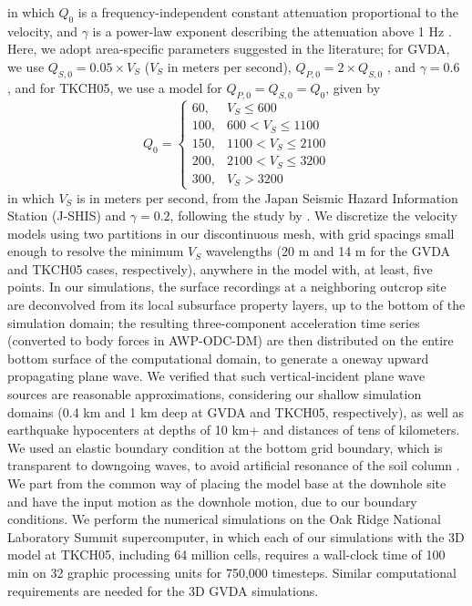 {\noindent in which $Q_0$ is a frequency-independent constant attenuation proportional to the velocity, and $\gamma$ is a power-law exponent describing the attenuation above 1 Hz \citep{withersMemoryEfficientSimulation2015}. Here, we adopt area-specific parameters suggested in the literature; for GVDA, we use $Q_{S,0}=0.05 \times V_S$ ($V_S$ in meters per second), $Q_{P,0}=2 \times Q_{S,0}$ , and $\gamma=0.6$ \citep[for southern Calfornia]{withersMemoryEfficientSimulation2015}, and for TKCH05, we use a model for $Q_{P,0}=Q_{S,0}=Q_0$, given by
\begin{equation}
  Q_{0}=\left\{\begin{array}{ll}
    60,  & V_{S} \leq 600       \\
    100, & 600<V_{S} \leq 1100  \\
    150, & 1100<V_{S} \leq 2100 \\
    \label{eq:etf-5}
    200, & 2100<V_{S} \leq 3200 \\
    300, & V_{S}>3200
  \end{array}\right.
\end{equation}
\noindent in which $V_S$ is in meters per second, from the Japan Seismic Hazard Information Station (J-SHIS) and $\gamma=0.2$, following the study by \citet{nakajimaSeismicAttenuationNortheastern2013}. We discretize the velocity models using two partitions in our discontinuous mesh, with grid spacings small enough to resolve the minimum $V_S$ wavelengths (20 m and 14 m for the GVDA and TKCH05 cases, respectively), anywhere in the model with, at least, five points. In our simulations, the surface recordings at a neighboring outcrop site are deconvolved from its local subsurface property layers, up to the bottom of the simulation domain; the resulting three-component acceleration time series (converted to body forces in AWP-ODC-DM) are then distributed on the entire bottom surface of the computational domain, to generate a oneway upward propagating plane wave. We verified that such vertical-incident plane wave sources are reasonable approximations, considering our shallow simulation domains (0.4 km and 1 km deep at GVDA and TKCH05, respectively), as well as earthquake hypocenters at depths of 10 km+ and distances of tens of kilometers. We used an elastic boundary condition at the bottom grid boundary, which is transparent to downgoing waves, to avoid artificial resonance of the soil column \citep{roten3DSimulationsEarthquakes2012}. We part from the common way of placing the model base at the downhole site and have the input motion as the downhole motion, due to our boundary conditions. We perform the numerical simulations on the Oak Ridge National Laboratory Summit supercomputer, in which each of our simulations with the 3D model at TKCH05, including 64 million cells, requires a wall-clock time of 100 min on 32 graphic processing units for 750,000 timesteps. Similar computational requirements are needed for the 3D GVDA simulations.


}
